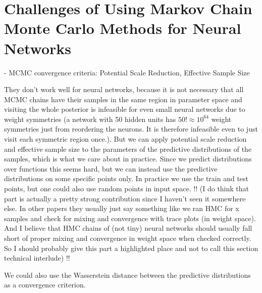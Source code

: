 \documentclass[../thesis.tex]{subfiles}
\begin{document}
\bigskip

\section{Challenges of Using Markov Chain Monte Carlo Methods for Neural Networks}

- MCMC convergence criteria:
Potential Scale Reduction, Effective Sample Size

They don't work well for neural networks, because it is not necessary that all MCMC chains have their samples in the same region in parameter space and visiting the whole posterior is infeasible for even small neural networks due to weight symmetries (a network with 50 hidden units has $50!\approx 10^64$ weight symmetries just from reordering the neurons. It is therefore infeasible even to just visit each symmetric region once.). But we can apply potential scale reduction and effective sample size to the parameters of the predictive distributions of the samples, which is what we care about in practice. Since we predict distributions over functions this seems hard, but we can instead use the predictive distributions on some specific points only. In practice we use the train and test points, but one could also use random points in input space. !! (I do think that part is actually a pretty strong contribution since I haven't seen it somewhere else. In other papers they usually just say something like we ran HMC for x samples and check for mixing and convergence with trace plots (in weight space). And I believe that HMC chains of (not tiny) neural networks should usually fall short of proper mixing and convergence in weight space when checked correctly. So I should probably give this part a highlighted place and not to call this section technical interlude) !! 

We could also use the Wasserstein distance between the predictive distributions as a convergence criterion.
\end{document}
